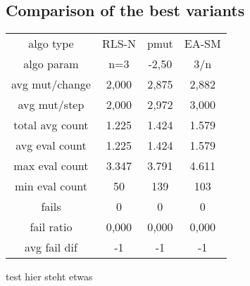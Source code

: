 \subsection{Comparison of the best variants}

\begin{tabular}[h]{cccc}
algo type&            RLS-N&      pmut&     EA-SM\\
algo param&             n=3&     -2,50&       3/n\\
avg mut/change&       2,000&     2,875&     2,882\\
avg mut/step&         2,000&     2,972&     3,000\\
\hline
total avg count&      1.225&     1.424&     1.579\\
avg eval count&       1.225&     1.424&     1.579\\
max eval count&       3.347&     3.791&     4.611\\
min eval count&          50&       139&       103\\
\hline
fails&                    0&         0&         0\\
fail ratio&           0,000&     0,000&     0,000\\
avg fail dif&            -1&        -1&        -1\\
\end{tabular}

test hier steht etwas